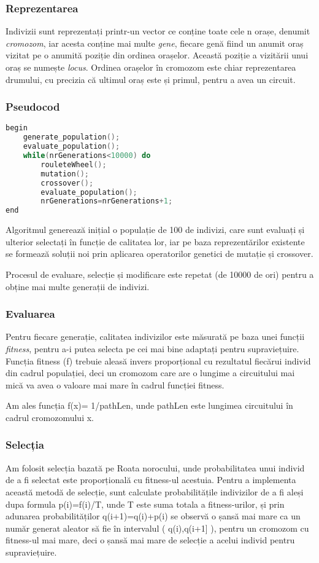 \documentclass{article}
\begin{document}
\subsubsection{Reprezentarea}

Indivizii sunt reprezentați printr-un vector ce conține toate cele n orașe, denumit \emph{cromozom}, iar acesta conține mai multe \emph{gene}, fiecare genă fiind un anumit oraș vizitat pe o anumită poziție din ordinea orașelor. Această poziție a vizitării unui oraș se numește \emph{locus}. Ordinea orașelor în cromozom este chiar reprezentarea drumului, cu precizia că ultimul oraș este și primul, pentru a avea un circuit.



\subsubsection{Pseudocod}
\begin{lstlisting}[language=c++]
begin
	generate_population();
	evaluate_population();
	while(nrGenerations<10000) do
		rouleteWheel();
		mutation();
		crossover();
		evaluate_population();
		nrGenerations=nrGenerations+1;
end
\end{lstlisting}
Algoritmul generează inițial o populație de 100 de indivizi, care sunt evaluați și ulterior selectați în funcție de calitatea lor, iar pe baza reprezentărilor existente se formează soluții noi prin aplicarea operatorilor genetici de mutație și crossover.
\par Procesul de evaluare, selecție și modificare este repetat (de 10000 de ori) pentru a obține mai multe generații de indivizi.
\subsubsection{Evaluarea}
Pentru fiecare generație, calitatea indivizilor este măsurată pe baza unei funcții \emph{fitness}, pentru a-i putea selecta pe cei mai bine adaptați pentru supraviețuire. 
Funcția fitness (f) trebuie aleasă invers proporțional cu rezultatul fiecărui individ din cadrul populației, deci un cromozom care are o lungime a circuitului mai mică va avea o valoare mai mare în cadrul funcției fitness.
\par Am ales funcția f(x)= 1/pathLen, unde pathLen este lungimea circuitului în cadrul cromozomului x.


\subsubsection{Selecția}
Am folosit selecția bazată pe Roata norocului, unde probabilitatea unui individ de a fi selectat este proporțională cu fitness-ul acestuia. Pentru a implementa această metodă de selecție, sunt calculate probabilitățile indivizilor de a fi aleși dupa formula p(i)=f(i)/T, unde T este suma totala a fitness-urilor, și prin adunarea probabilităților q(i+1)=q(i)+p(i) se observă o șansă mai mare ca un număr generat aleator să fie în intervalul ( q(i),q(i+1] ), pentru un cromozom cu fitness-ul mai mare, deci o șansă mai mare de selecție a acelui individ pentru supraviețuire.
\end{document}
